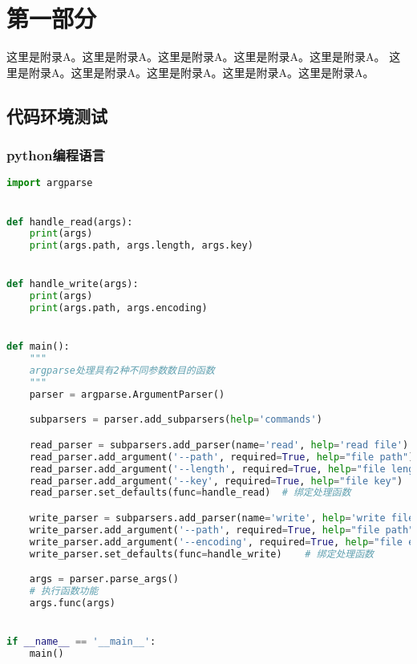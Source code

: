 
\newpage



\section{第一部分}\label{sec:appendix-1}

这里是附录A。这里是附录A。这里是附录A。这里是附录A。这里是附录A。
这里是附录A。这里是附录A。这里是附录A。这里是附录A。这里是附录A。

\subsection{代码环境测试}

\subsubsection{python编程语言}

\begin{lstlisting}[language=python]
import argparse


def handle_read(args):
    print(args)
    print(args.path, args.length, args.key)


def handle_write(args):
    print(args)
    print(args.path, args.encoding)


def main():
    """
    argparse处理具有2种不同参数数目的函数
    """
    parser = argparse.ArgumentParser()

    subparsers = parser.add_subparsers(help='commands')

    read_parser = subparsers.add_parser(name='read', help='read file')
    read_parser.add_argument('--path', required=True, help="file path")
    read_parser.add_argument('--length', required=True, help="file length")
    read_parser.add_argument('--key', required=True, help="file key")
    read_parser.set_defaults(func=handle_read)  # 绑定处理函数

    write_parser = subparsers.add_parser(name='write', help='write file')
    write_parser.add_argument('--path', required=True, help="file path")
    write_parser.add_argument('--encoding', required=True, help="file encoding")
    write_parser.set_defaults(func=handle_write)    # 绑定处理函数

    args = parser.parse_args()
    # 执行函数功能
    args.func(args)


if __name__ == '__main__':
    main()

\end{lstlisting}


